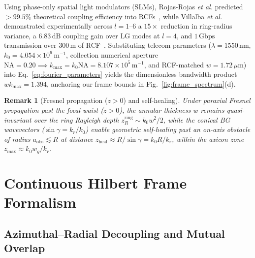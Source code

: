 \documentclass[aps,pra,reprint,amsmath,amssymb,floatfix,longbibliography]{revtex4-2}
\newtheorem{remark}{Remark}
\begin{document}
Using phase-only spatial light modulators (SLMs), Rojas-Rojas \emph{et al.} predicted $>99.5\%$ theoretical coupling efficiency into RCFs~\cite{RojasRojas2021}, while Villalba \emph{et al.} demonstrated experimentally across $l=1\text{--}6$ a $15\times$ reduction in ring-radius variance, a $6.83\,\mathrm{dB}$ coupling gain over $\mathrm{LG}$ modes at $l=4$, and $1\,\mathrm{Gbps}$ transmission over $300\,\mathrm{m}$ of RCF~\cite{Villalba2023}. Substituting telecom parameters ($\lambda = 1550\,\mathrm{nm}$, $k_0 = 4.054\times 10^6\,\mathrm{m}^{-1}$, collection numerical aperture $\mathrm{NA} = 0.20 \implies k_{\max} = k_0 \mathrm{NA} = 8.107\times 10^5\,\mathrm{m}^{-1}$, and RCF-matched $w = 1.72\,\mu\mathrm{m}$) into Eq.~\eqref{eq:fourier_parameters} yields the dimensionless bandwidth product $w k_{\max} = 1.394$, anchoring our frame bounds in Fig.~\ref{fig:frame_spectrum}(d).

\begin{remark}[Fresnel propagation (\texorpdfstring{$z>0$}{z > 0}) and self-healing]
\label{rem:propagation}
Under paraxial Fresnel propagation past the focal waist ($z>0$), the annular thickness $w$ remains quasi-invariant over the ring Rayleigh depth $z_R^{\mathrm{ring}} \sim k_0 w^2/2$, while the conical BG wavevectors ($\sin\gamma = k_r/k_0$) enable geometric self-healing past an on-axis obstacle of radius $a_{\mathrm{obs}} \lesssim R$ at distance $z_{\mathrm{heal}} \approx R/\sin\gamma = k_0 R/k_r$, within the axicon zone $z_{\max} \approx k_0 w_g/k_r$.
\end{remark}

\section{Continuous Hilbert Frame Formalism}
\label{sec:frame_formalism}

\subsection{Azimuthal--Radial Decoupling and Mutual Overlap}
\label{subsec:overlap_kernel}
\end{document}
